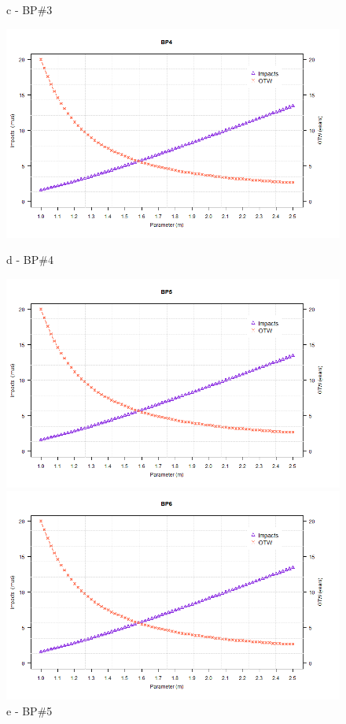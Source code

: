 \begin{figure}[!htb]
\begin{minipage}[b]{0.5\linewidth}
		\caption*{c - BP\#3}
	\end{minipage}
	\hspace{0.05cm}
	\begin{minipage}[b]{0.5\linewidth}
		\centering
		\includegraphics[width=\textwidth]{figures/ch05_fig_sam_pump4}
		\caption*{d - BP\#4}
	\end{minipage}
	\hspace{0.05cm}
	\begin{minipage}[b]{0.5\linewidth}
		\centering
		\includegraphics[width=\textwidth]{figures/ch05_fig_sam_pump5}
		\caption*{e - BP\#5}
	\end{minipage}
	\hspace{0.05cm}
	\begin{minipage}[b]{0.5\linewidth}
		\centering
		\includegraphics[width=\textwidth]{figures/ch05_fig_sam_pump6}

\end{minipage}
\end{figure}
